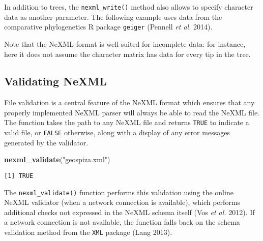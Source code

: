 \documentclass[author-year, review, 11pt]{components/elsarticle} %
\newenvironment{Shaded}{\begin{snugshade}}{\end{snugshade}}
\newcommand{\KeywordTok}[1]{\textcolor[rgb]{0.13,0.29,0.53}{\textbf{{#1}}}}
\newcommand{\DataTypeTok}[1]{\textcolor[rgb]{0.13,0.29,0.53}{{#1}}}
\newcommand{\StringTok}[1]{\textcolor[rgb]{0.31,0.60,0.02}{{#1}}}
\newcommand{\NormalTok}[1]{{#1}}
\begin{document}
In addition to trees, the \texttt{nexml\_write()} method also allows to
specify character data as another parameter. The following example uses
data from the comparative phylogenetics R package \texttt{geiger}
(Pennell \emph{et al.} 2014).

\begin{Shaded}
\end{Shaded}

Note that the NeXML format is well-suited for incomplete data: for
instance, here it does not assume the character matrix has data for
every tip in the tree.

\subsection{Validating NeXML}\label{validating-nexml}

File validation is a central feature of the NeXML format which ensures
that any properly implemented NeXML parser will always be able to read
the NeXML file. The function takes the path to any NeXML file and
returns \texttt{TRUE} to indicate a valid file, or \texttt{FALSE}
otherwise, along with a display of any error messages generated by the
validator.

\begin{Shaded}
\begin{Highlighting}[]
\KeywordTok{nexml_validate}\NormalTok{(}\StringTok{"geospiza.xml"}\NormalTok{)}
\end{Highlighting}
\end{Shaded}

\begin{verbatim}
[1] TRUE
\end{verbatim}

The \texttt{nexml\_validate()} function performs this validation using
the online NeXML validator (when a network connection is available),
which performs additional checks not expressed in the NeXML schema
itself (Vos \emph{et al.} 2012). If a network connection is not
available, the function falls back on the schema validation method from
the \texttt{XML} package (Lang 2013).
\end{document}
